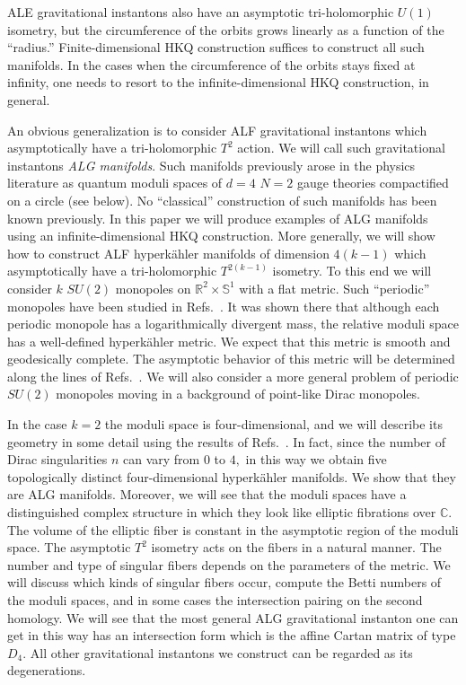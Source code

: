 \documentclass[a4paper,12pt, amsfonts, amssymb]{article}
\newcommand{\CC}{{\mathbb C}}
\newcommand{\RR}{{\mathbb R}}
\renewcommand{\SS}{{\mathbb S}}
\begin{document}
ALE gravitational instantons also have an asymptotic tri-holomorphic $U(1)$ isometry, but the circumference of the orbits grows
linearly as a function of the ``radius.'' Finite-dimensional HKQ construction
suffices to construct all such manifolds. In the cases when the
circumference of the orbits stays fixed at infinity, one needs to resort
to the infinite-dimensional HKQ construction, in general.

An obvious generalization is to consider ALF gravitational instantons
which asymptotically have a tri-holomorphic $T^2$ action. We will call such
gravitational instantons {\it ALG manifolds}. Such manifolds previously
arose in the physics literature as quantum moduli spaces of $d=4$ $N=2$ gauge
theories compactified on a circle (see below). No ``classical''
construction of such manifolds has been known previously. In this paper we
will produce examples of ALG manifolds using an infinite-dimensional HKQ
construction. More generally, we will show
how to construct ALF hyperk\"ahler manifolds of dimension $4(k-1)$ which
asymptotically have a tri-holomorphic $T^{2(k-1)}$ isometry.
To this end we will consider $k$ $SU(2)$ monopoles on
$\RR^2\times\SS^1$ with a flat metric. Such ``periodic'' monopoles have
been studied in Refs.~\cite{usone, ustwo}.
It was shown there that although each
periodic monopole has a logarithmically divergent mass, the relative
moduli space has a well-defined hyperk\"ahler metric. We expect
that this metric is smooth and geodesically complete. The asymptotic
behavior of this metric will be determined along the lines of Refs.~\cite{Mtn,GM}.
We will also consider a more general problem of periodic $SU(2)$ monopoles
moving in a background of point-like Dirac monopoles.

In the case $k=2$ the moduli space is four-dimensional, and
we will describe its geometry in some detail using the results of Refs.~\cite{usone,ustwo}. In fact, since the number of Dirac singularities
$n$ can vary from $0$ to $4,$ in this way we obtain five topologically
distinct four-dimensional hyperk\"ahler manifolds. We show that they are
ALG manifolds. Moreover, we will see that
the moduli spaces have a distinguished complex structure in which they
look like elliptic fibrations over $\CC$. The volume of the elliptic
fiber is constant in the asymptotic region of the moduli space.
The asymptotic $T^2$ isometry
acts on the fibers in a natural manner. The number and type of singular
fibers depends on the parameters of the metric.
We will discuss which kinds of singular fibers occur,
compute the Betti numbers of the moduli spaces, and in some cases the intersection pairing on the second homology.
We will see that the most general ALG gravitational instanton one can get in this way has an intersection form which is the affine Cartan matrix of type $D_4$. All other gravitational instantons we construct can be regarded as its degenerations.
\end{document}

